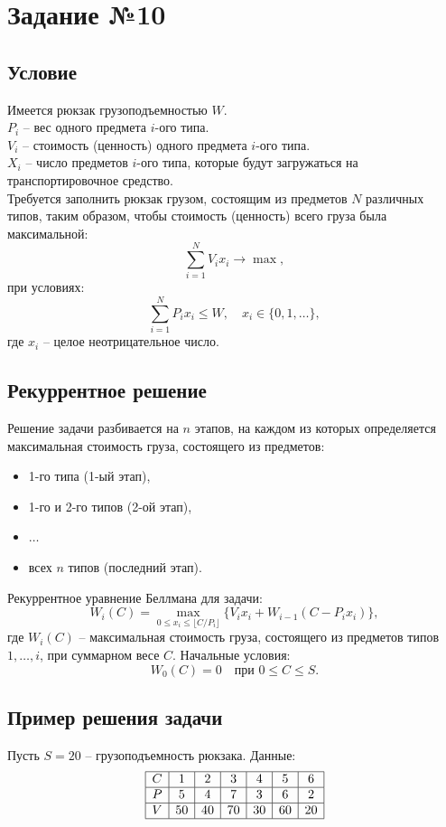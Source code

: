 \documentclass{article}
\begin{document}

\newpage
\section{Задание №10}
\subsection{Условие}

Имеется рюкзак грузоподъемностью $W$. \\
$P_i$ -- вес одного предмета $i$-ого типа. \\
$V_i$ -- стоимость (ценность) одного предмета $i$-ого типа. \\
$X_i$ -- число предметов $i$-ого типа, которые будут загружаться на транспортировочное средство. \\

Требуется заполнить рюкзак грузом, состоящим из предметов $N$ различных типов, таким образом, чтобы стоимость (ценность) всего груза была максимальной:
\[
    \sum_{i=1}^N V_i x_i \to \max,
\]
при условиях:
\[
    \sum_{i=1}^N P_i x_i \leq W, \quad x_i \in \{0, 1, \dots\},
\]
где $x_i$ -- целое неотрицательное число.

\subsection*{Рекуррентное решение}
Решение задачи разбивается на $n$ этапов, на каждом из которых определяется максимальная стоимость груза, состоящего из предметов:
\begin{itemize}
    \item 1-го типа (1-ый этап),
    \item 1-го и 2-го типов (2-ой этап),
    \item $\dots$
    \item всех $n$ типов (последний этап).
\end{itemize}

Рекуррентное уравнение Беллмана для задачи:
\[
    W_i(C) = \max_{0 \leq x_i \leq \lfloor C / P_i \rfloor} \{ V_i x_i + W_{i-1}(C - P_i x_i) \},
\]
где $W_i(C)$ -- максимальная стоимость груза, состоящего из предметов типов $1, \dots, i$, при суммарном весе $C$. Начальные условия:
\[
    W_0(C) = 0 \quad \text{при $0 \leq C \leq S$}.
\]

\subsection*{Пример решения задачи}
Пусть $S = 20$ -- грузоподъемность рюкзака. Данные:
\[
    \begin{array}{|c|c|c|c|c|c|c|}
        \hline
        C & 1  & 2  & 3  & 4  & 5  & 6  \\
        \hline
        P & 5  & 4  & 7  & 3  & 6  & 2  \\
        \hline
        V & 50 & 40 & 70 & 30 & 60 & 20 \\
        \hline
    \end{array}
\]
\end{document}
